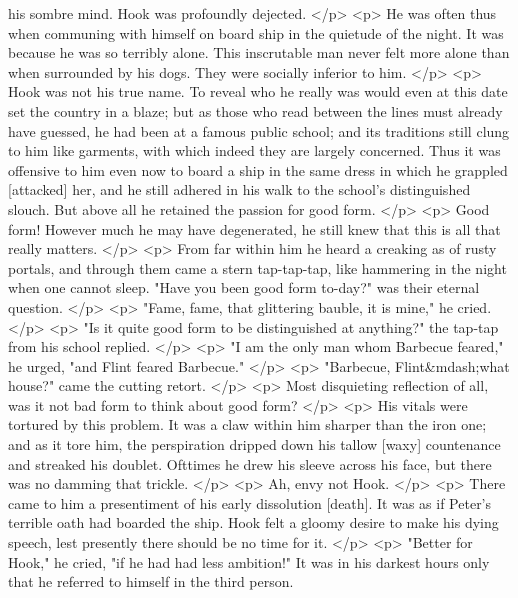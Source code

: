       his sombre mind. Hook was profoundly dejected.
    </p>
    <p>
      He was often thus when communing with himself on board ship in the
      quietude of the night. It was because he was so terribly alone. This
      inscrutable man never felt more alone than when surrounded by his dogs.
      They were socially inferior to him.
    </p>
    <p>
      Hook was not his true name. To reveal who he really was would even at this
      date set the country in a blaze; but as those who read between the lines
      must already have guessed, he had been at a famous public school; and its
      traditions still clung to him like garments, with which indeed they are
      largely concerned. Thus it was offensive to him even now to board a ship
      in the same dress in which he grappled [attacked] her, and he still
      adhered in his walk to the school's distinguished slouch. But above all he
      retained the passion for good form.
    </p>
    <p>
      Good form! However much he may have degenerated, he still knew that this
      is all that really matters.
    </p>
    <p>
      From far within him he heard a creaking as of rusty portals, and through
      them came a stern tap-tap-tap, like hammering in the night when one cannot
      sleep. "Have you been good form to-day?" was their eternal question.
    </p>
    <p>
      "Fame, fame, that glittering bauble, it is mine," he cried.
    </p>
    <p>
      "Is it quite good form to be distinguished at anything?" the tap-tap from
      his school replied.
    </p>
    <p>
      "I am the only man whom Barbecue feared," he urged, "and Flint feared
      Barbecue."
    </p>
    <p>
      "Barbecue, Flint&mdash;what house?" came the cutting retort.
    </p>
    <p>
      Most disquieting reflection of all, was it not bad form to think about
      good form?
    </p>
    <p>
      His vitals were tortured by this problem. It was a claw within him sharper
      than the iron one; and as it tore him, the perspiration dripped down his
      tallow [waxy] countenance and streaked his doublet. Ofttimes he drew his
      sleeve across his face, but there was no damming that trickle.
    </p>
    <p>
      Ah, envy not Hook.
    </p>
    <p>
      There came to him a presentiment of his early dissolution [death]. It was
      as if Peter's terrible oath had boarded the ship. Hook felt a gloomy
      desire to make his dying speech, lest presently there should be no time
      for it.
    </p>
    <p>
      "Better for Hook," he cried, "if he had had less ambition!" It was in his
      darkest hours only that he referred to himself in the third person.
